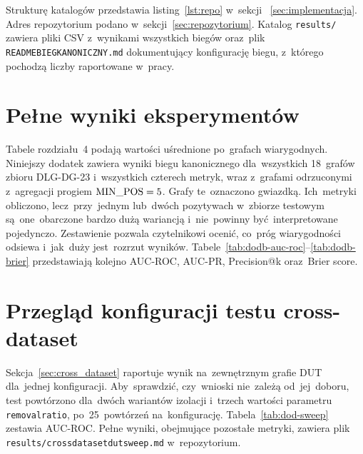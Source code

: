\documentclass[polish,master,a4paper,oneside]{ppfcmthesis}
\renewcommand{\_}{\origtextunderscore\ifmmode\else\allowbreak\fi}
\begin{document}
Strukturę katalogów przedstawia listing~\ref{lst:repo} w~sekcji~
\ref{sec:implementacja}. Adres repozytorium podano
w~sekcji~\ref{sec:repozytorium}. Katalog \texttt{results/} zawiera pliki CSV
z~wynikami wszystkich biegów oraz~plik \texttt{README\_BIEG\_KANONICZNY.md}
dokumentujący konfigurację biegu, z~którego pochodzą liczby raportowane
w~pracy.

\chapter{Pełne wyniki eksperymentów}
\label{dod:wyniki}

Tabele rozdziału~4 podają wartości uśrednione po~grafach wiarygodnych.
Niniejszy dodatek zawiera wyniki biegu kanonicznego dla~wszystkich
18~grafów zbioru DLG-DG-23 i~wszystkich czterech metryk, wraz z~grafami
odrzuconymi z~agregacji progiem $\mathrm{MIN\_POS} = 5$. Grafy te~oznaczono
gwiazdką. Ich~metryki obliczono, lecz~przy~jednym lub~dwóch pozytywach
w~zbiorze testowym są~one~obarczone bardzo dużą wariancją i~nie~powinny
być~interpretowane pojedynczo. Zestawienie pozwala czytelnikowi ocenić,
co~próg wiarygodności odsiewa i~jak~duży jest~rozrzut wyników.
Tabele~\ref{tab:dodb-auc-roc}--\ref{tab:dodb-brier} przedstawiają kolejno
AUC-ROC, AUC-PR, Precision@k oraz~Brier score.



\chapter{Przegląd konfiguracji testu cross-dataset}
\label{dod:sweep}

Sekcja~\ref{sec:cross_dataset} raportuje wynik na~zewnętrznym grafie DUT
dla~jednej konfiguracji. Aby~sprawdzić, czy~wnioski nie~zależą od~jej~doboru,
test powtórzono dla~dwóch wariantów izolacji i~trzech wartości parametru
\texttt{removal\_ratio}, po~25~powtórzeń na~konfigurację.
Tabela~\ref{tab:dod-sweep} zestawia AUC-ROC. Pełne wyniki, obejmujące
pozostałe metryki, zawiera plik
\texttt{results/cross\_dataset\_dut\_sweep.md} w~repozytorium.
\end{document}
